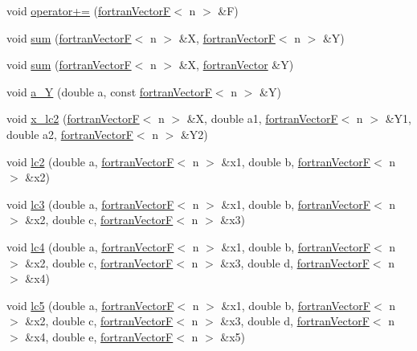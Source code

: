 \begin{DoxyCompactItemize}
\item 
void \hyperlink{classodes_1_1fortranVectorF_a71be5e05948ac8584f53721a5923c4e3}{operator+=} (\hyperlink{classodes_1_1fortranVectorF}{fortran\+Vector\+F}$<$ n $>$ \&F)
\item 
void \hyperlink{classodes_1_1fortranVectorF_a26bf73ecfddcb1833ecd49d87455942e}{sum} (\hyperlink{classodes_1_1fortranVectorF}{fortran\+Vector\+F}$<$ n $>$ \&X, \hyperlink{classodes_1_1fortranVectorF}{fortran\+Vector\+F}$<$ n $>$ \&Y)
\item 
void \hyperlink{classodes_1_1fortranVectorF_a5efafdae76a0b8ac9db80430e3f08755}{sum} (\hyperlink{classodes_1_1fortranVectorF}{fortran\+Vector\+F}$<$ n $>$ \&X, \hyperlink{classodes_1_1fortranVector}{fortran\+Vector} \&Y)
\item 
void \hyperlink{classodes_1_1fortranVectorF_a4d0bef7a99cf98de9325074b26cbf0c9}{a\+\_\+\+Y} (double a, const \hyperlink{classodes_1_1fortranVectorF}{fortran\+Vector\+F}$<$ n $>$ \&Y)
\item 
void \hyperlink{classodes_1_1fortranVectorF_ac0070788755cc24441ee3076b2af4ec7}{x\+\_\+lc2} (\hyperlink{classodes_1_1fortranVectorF}{fortran\+Vector\+F}$<$ n $>$ \&X, double a1, \hyperlink{classodes_1_1fortranVectorF}{fortran\+Vector\+F}$<$ n $>$ \&Y1, double a2, \hyperlink{classodes_1_1fortranVectorF}{fortran\+Vector\+F}$<$ n $>$ \&Y2)
\item 
void \hyperlink{classodes_1_1fortranVectorF_a846832856478adfe05c207e0903d8984}{lc2} (double a, \hyperlink{classodes_1_1fortranVectorF}{fortran\+Vector\+F}$<$ n $>$ \&x1, double b, \hyperlink{classodes_1_1fortranVectorF}{fortran\+Vector\+F}$<$ n $>$ \&x2)
\item 
void \hyperlink{classodes_1_1fortranVectorF_a0a05d3cc41b7e0efa272f3bdb392590d}{lc3} (double a, \hyperlink{classodes_1_1fortranVectorF}{fortran\+Vector\+F}$<$ n $>$ \&x1, double b, \hyperlink{classodes_1_1fortranVectorF}{fortran\+Vector\+F}$<$ n $>$ \&x2, double c, \hyperlink{classodes_1_1fortranVectorF}{fortran\+Vector\+F}$<$ n $>$ \&x3)
\item 
void \hyperlink{classodes_1_1fortranVectorF_adef7bf6120c35cc4498e29e3ab3e2cb9}{lc4} (double a, \hyperlink{classodes_1_1fortranVectorF}{fortran\+Vector\+F}$<$ n $>$ \&x1, double b, \hyperlink{classodes_1_1fortranVectorF}{fortran\+Vector\+F}$<$ n $>$ \&x2, double c, \hyperlink{classodes_1_1fortranVectorF}{fortran\+Vector\+F}$<$ n $>$ \&x3, double d, \hyperlink{classodes_1_1fortranVectorF}{fortran\+Vector\+F}$<$ n $>$ \&x4)
\item 
void \hyperlink{classodes_1_1fortranVectorF_afff1eb41f54c2f84063c6a29fc8bd0f5}{lc5} (double a, \hyperlink{classodes_1_1fortranVectorF}{fortran\+Vector\+F}$<$ n $>$ \&x1, double b, \hyperlink{classodes_1_1fortranVectorF}{fortran\+Vector\+F}$<$ n $>$ \&x2, double c, \hyperlink{classodes_1_1fortranVectorF}{fortran\+Vector\+F}$<$ n $>$ \&x3, double d, \hyperlink{classodes_1_1fortranVectorF}{fortran\+Vector\+F}$<$ n $>$ \&x4, double e, \hyperlink{classodes_1_1fortranVectorF}{fortran\+Vector\+F}$<$ n $>$ \&x5)

\end{DoxyCompactItemize}
